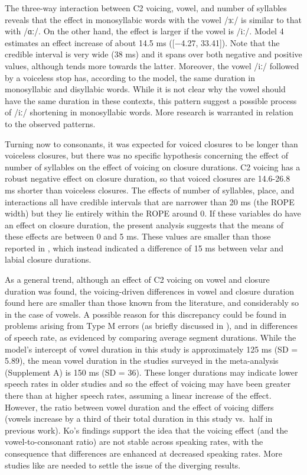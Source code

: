 \documentclass[12pt,a4paper,]{article}
\begin{document}
The three-way interaction between C2 voicing, vowel, and number of
syllables reveals that the effect in monosyllabic words with the vowel
/ɜː/ is similar to that with /ɑː/. On the other hand, the effect is
larger if the vowel is /iː/. Model 4 estimates an effect increase of
about 14.5 ms ({[}−4.27, 33.41{]}). Note that the credible interval is
very wide (38 ms) and it spans over both negative and positive values,
although tends more towards the latter. Moreover, the vowel /iː/
followed by a voiceless stop has, according to the model, the same
duration in monosyllabic and disyllabic words. While it is not clear why
the vowel should have the same duration in these contexts, this pattern
suggest a possible process of /iː/ shortening in monosyllabic words.
More research is warranted in relation to the observed patterns.

Turning now to consonants, it was expected for voiced closures to be
longer than voiceless closures, but there was no specific hypothesis
concerning the effect of number of syllables on the effect of voicing on
closure durations. C2 voicing has a robust negative effect on closure
duration, so that voiced closures are 14.6-26.8 ms shorter than
voiceless closures. The effects of number of syllables, place, and
interactions all have credible intervals that are narrower than 20 ms
(the ROPE width) but they lie entirely within the ROPE around 0. If
these variables do have an effect on closure duration, the present
analysis suggests that the means of these effects are between 0 and 5
ms. These values are smaller than those reported in \citet{sharf1962},
which instead indicated a difference of 15 ms between velar and labial
closure durations.

As a general trend, although an effect of C2 voicing on vowel and
closure duration was found, the voicing-driven differences in vowel and
closure duration found here are smaller than those known from the
literature, and considerably so in the case of vowels. A possible reason
for this discrepancy could be found in problems arising from Type M
errors (as briefly discussed in ), and in differences of
speech rate, as evidenced by comparing average segment durations. While
the model's intercept of vowel duration in this study is approximately
125 ms (SD = 5.89), the mean vowel duration in the studies surveyed in
the meta-analysis (Supplement A) is 150 ms (SD = 36). These longer
durations may indicate lower speech rates in older studies and so the
effect of voicing may have been greater there than at higher speech
rates, assuming a linear increase of the effect. However, the ratio
between vowel duration and the effect of voicing differs (vowels
increase by a third of their total duration in this study vs.~half in
previous work). Ko's findings \citeyear{ko2018} support the idea that
the voicing effect (and the vowel-to-consonant ratio) are not stable
across speaking rates, with the consequence that differences are
enhanced at decreased speaking rates. More studies like \citet{ko2018}
are needed to settle the issue of the diverging results.
\end{document}
